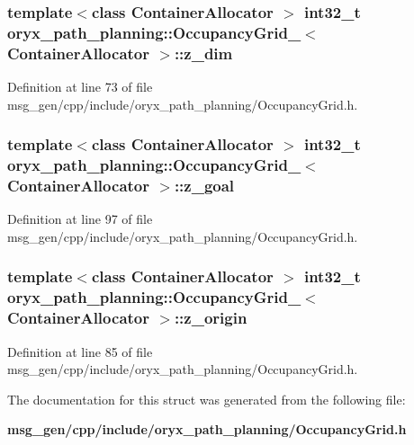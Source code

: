 \subsubsection[{z\-\_\-dim}]{\setlength{\rightskip}{0pt plus 5cm}template$<$class Container\-Allocator $>$ int32\-\_\-t {\bf oryx\-\_\-path\-\_\-planning\-::\-Occupancy\-Grid\-\_\-}$<$ \-Container\-Allocator $>$\-::{\bf z\-\_\-dim}}\label{structoryx__path__planning_1_1OccupancyGrid___a3c050ade0429047dc2793957aaa90e84}


\-Definition at line 73 of file msg\-\_\-gen/cpp/include/oryx\-\_\-path\-\_\-planning/\-Occupancy\-Grid.\-h.

\subsubsection[{z\-\_\-goal}]{\setlength{\rightskip}{0pt plus 5cm}template$<$class Container\-Allocator $>$ int32\-\_\-t {\bf oryx\-\_\-path\-\_\-planning\-::\-Occupancy\-Grid\-\_\-}$<$ \-Container\-Allocator $>$\-::{\bf z\-\_\-goal}}\label{structoryx__path__planning_1_1OccupancyGrid___a7818c2dbecbd4e33ac30952c9f0a4abc}


\-Definition at line 97 of file msg\-\_\-gen/cpp/include/oryx\-\_\-path\-\_\-planning/\-Occupancy\-Grid.\-h.

\subsubsection[{z\-\_\-origin}]{\setlength{\rightskip}{0pt plus 5cm}template$<$class Container\-Allocator $>$ int32\-\_\-t {\bf oryx\-\_\-path\-\_\-planning\-::\-Occupancy\-Grid\-\_\-}$<$ \-Container\-Allocator $>$\-::{\bf z\-\_\-origin}}\label{structoryx__path__planning_1_1OccupancyGrid___aec4ef1c746acac27209817f79f7958b9}


\-Definition at line 85 of file msg\-\_\-gen/cpp/include/oryx\-\_\-path\-\_\-planning/\-Occupancy\-Grid.\-h.



\-The documentation for this struct was generated from the following file\-:\begin{DoxyCompactItemize}
\item 
{\bf msg\-\_\-gen/cpp/include/oryx\-\_\-path\-\_\-planning/\-Occupancy\-Grid.\-h}\end{DoxyCompactItemize}
